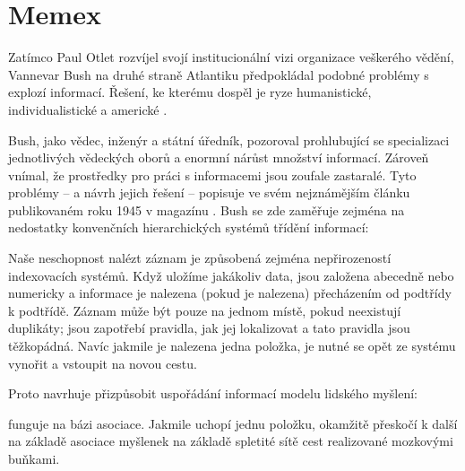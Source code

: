 \section{Memex}
\label{sec:memex}

Zatímco Paul Otlet rozvíjel svojí institucionální vizi organizace veškerého vědění, Vannevar Bush na druhé straně Atlantiku předpokládal podobné problémy s explozí informací. Řešení, ke kterému dospěl je ryze humanistické, individualistické a americké \autocite{Wright2015}.

Bush, jako vědec, inženýr a státní úředník, pozoroval prohlubující se specializaci jednotlivých vědeckých oborů a enormní nárůst množství informací. Zároveň vnímal, že prostředky pro práci s informacemi jsou zoufale zastaralé. Tyto problémy -- a návrh jejich řešení -- popisuje ve svém nejznámějším článku  publikovaném roku 1945 v magazínu . Bush se zde zaměřuje zejména na nedostatky konvenčních hierarchických systémů třídění informací:

\begin{quoted}{\autocite[6]{Bush1945}}
Naše neschopnost nalézt  záznam je způsobená zejména nepřirozeností indexovacích systémů. Když uložíme jakákoliv data, jsou založena abecedně nebo numericky a informace je nalezena (pokud je nalezena) přecházením od podtřídy k podtřídě. Záznam může být pouze na jednom místě, pokud neexistují duplikáty; jsou zapotřebí pravidla, jak jej lokalizovat a tato pravidla jsou těžkopádná. Navíc jakmile je nalezena jedna položka, je nutné se opět ze systému vynořit a vstoupit na novou cestu.
\end{quoted}

Proto navrhuje přizpůsobit uspořádání informací modelu lidského myšlení:

\begin{quoted}{\autocite[6]{Bush1945}}
 funguje na bázi asociace. Jakmile uchopí jednu položku, okamžitě přeskočí k další na základě asociace myšlenek na základě spletité sítě cest realizované mozkovými buňkami.
\end{quoted}

